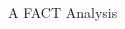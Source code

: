 \documentclass[compress, 9pt, aspectratio=1610, professionalfonts]{beamer}
\begin{document}
\begin{frame}[t]{A FACT Analysis}
\begin{columns}[onlytextwidth]
\begin{column}{0.475\textwidth}
    \end{column}%
  \end{columns}
\end{frame}
\end{document}
